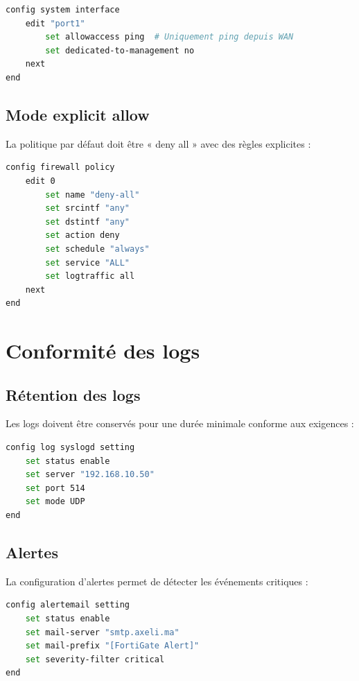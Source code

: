 \begin{lstlisting}[language=bash, caption={Durcissement interface WAN}]
config system interface
    edit "port1"
        set allowaccess ping  # Uniquement ping depuis WAN
        set dedicated-to-management no
    next
end
\end{lstlisting}

\subsection{Mode explicit allow}

La politique par défaut doit être « deny all » avec des règles explicites :

\begin{lstlisting}[language=bash, caption={Politique deny explicite}]
config firewall policy
    edit 0
        set name "deny-all"
        set srcintf "any"
        set dstintf "any"
        set action deny
        set schedule "always"
        set service "ALL"
        set logtraffic all
    next
end
\end{lstlisting}

\section{Conformité des logs}

\subsection{Rétention des logs}

Les logs doivent être conservés pour une durée minimale conforme aux exigences :

\begin{lstlisting}[language=bash, caption={Configuration de la rétention des logs}]
config log syslogd setting
    set status enable
    set server "192.168.10.50"
    set port 514
    set mode UDP
end
\end{lstlisting}

\subsection{Alertes}

La configuration d'alertes permet de détecter les événements critiques :

\begin{lstlisting}[language=bash, caption={Configuration des alertes}]
config alertemail setting
    set status enable
    set mail-server "smtp.axeli.ma"
    set mail-prefix "[FortiGate Alert]"
    set severity-filter critical
end
\end{lstlisting}

